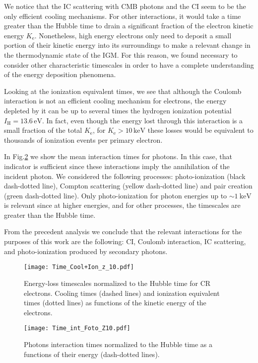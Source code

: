 \documentclass[baaa]{baaa}
\begin{document}
We notice that the IC scattering with CMB photons and the CI seem to be the only efficient cooling mechanisms. For other interactions, it would take a time greater than the Hubble time to drain a significant fraction of the electron kinetic energy $K_{\mathrm{e}}$. Nonetheless, high energy electrons only need to deposit a small portion of their kinetic energy into its surroundings to make a relevant change in the thermodynamic state of the IGM. For this reason, we found necessary to consider other characteristic timescales in order to have a complete understanding of the energy deposition phenomena.

Looking at the ionization equivalent times, we see that although the Coulomb interaction is not an efficient cooling mechanism for electrons, the energy depleted by it can be up to several times the hydrogen ionization potential $I_{\mathrm{H}} = 13.6 \, \mathrm{eV}$. In fact, even though the energy lost through this interaction is a small fraction of the total $K_{\mathrm{e}}$, for $K_{\mathrm{e}} > 10\,\mathrm{keV}$ these losses would be equivalent to thousands of ionization events per primary electron.

In Fig.\ref{Tiempos_Foton} we show the mean interaction times for photons. In this case, that indicator is sufficient since these interactions imply the annihilation of the incident photon. We considered the following processes: photo-ionization (black dash-dotted line), Compton scattering (yellow dash-dotted line) and pair creation (green dash-dotted line). Only photo-ionization for photon energies up to $\sim 1~\mathrm{keV}$ is relevant since at higher energies, and for other processes, the timescales are greater than the Hubble time. 

From the precedent analysis we conclude that the relevant interactions for the purposes of this work are the following: CI, Coulomb interaction, IC scattering, and photo-ionization produced by secondary photons.


\begin{figure}[h!]
\centering
\texttt{[image: Time\_Cool+Ion\_z\_10.pdf]}
\caption{Energy-loss timescales normalized to the Hubble time for CR electrons. Cooling times (dashed lines) and ionization equivalent times (dotted lines) as functions of the kinetic energy of the electrons.
}
\label{Tiempos_Elect}
\end{figure}

\begin{figure}[h!]

\texttt{[image: Time\_int\_Foto\_Z10.pdf]}
\caption{Photons interaction times normalized to the Hubble time  as a functions of their energy (dash-dotted lines). 
}

\label{Tiempos_Foton}
\end{figure}
\end{document}
